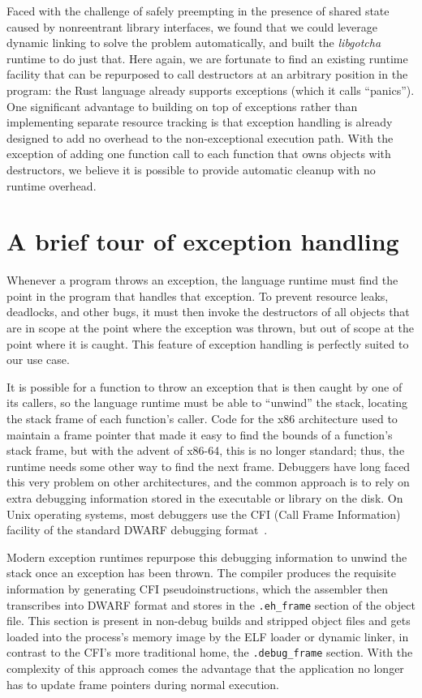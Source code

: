 Faced with the challenge of safely preempting in the presence of shared state caused
by nonreentrant library interfaces, we found that we could leverage dynamic linking
to solve the problem automatically, and built the \textit{libgotcha} runtime to do
just that.  Here again, we are fortunate to find an existing runtime facility that
can be repurposed to call destructors at an arbitrary position in the program:\@
the Rust language already supports exceptions (which it calls ``panics'').  One
significant advantage to building on top of exceptions rather than implementing
separate resource tracking is that exception handling is already designed to add no
overhead to the non-exceptional execution path.  With the exception of adding one
function call to each function that owns objects with destructors, we believe it is
possible to provide automatic cleanup with no runtime overhead.


\section{A brief tour of exception handling}

Whenever a program throws an exception, the language runtime must find the point in
the program that handles that exception.  To prevent resource leaks, deadlocks, and
other bugs, it must then invoke the destructors of all objects that are in scope at
the point where the exception was thrown, but out of scope at the point where it is
caught.  This feature of exception handling is perfectly suited to our use case.

It is possible for a function to throw an exception that is then caught by one of its
callers, so the language runtime must be able to ``unwind'' the stack, locating the
stack frame of each function's caller.  Code for the x86 architecture used to
maintain a frame pointer that made it easy to find the bounds of a function's stack
frame, but with the advent of x86-64, this is no longer standard; thus, the runtime
needs some other way to find the next frame.  Debuggers have long faced this very
problem on other architectures, and the common approach is to rely on extra debugging
information stored in the executable or library on the disk.  On Unix operating
systems, most debuggers use the CFI (Call Frame Information) facility of the standard
DWARF debugging format~\cite{eager:spec2012}.

Modern exception runtimes repurpose this debugging information to unwind the stack
once an exception has been thrown.  The compiler produces the requisite information
by generating CFI pseudoinstructions, which the assembler then transcribes into DWARF
format and stores in the \texttt{.eh\_frame} section of the object file.  This
section is present in non-debug builds and stripped object files and gets loaded into
the process's memory image by the ELF loader or dynamic linker, in contrast to the
CFI's more traditional home, the \texttt{.debug\_frame} section.  With the complexity
of this approach comes the advantage that the application no longer has to update
frame pointers during normal execution.

